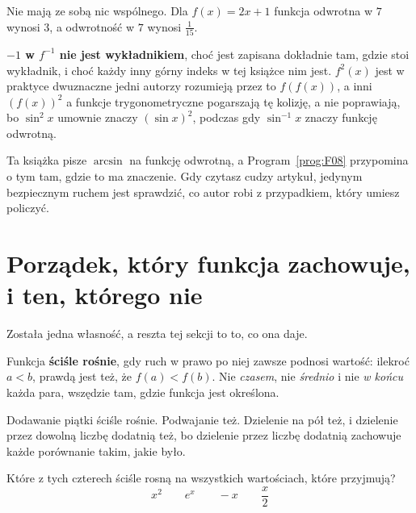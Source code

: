 \begin{fr}
Nie mają ze sobą nic wspólnego. Dla $f(x) = 2x + 1$ funkcja odwrotna w $7$
wynosi $3$, a odwrotność w $7$ wynosi $\frac{1}{15}$.

\begin{trapbox}
\textbf{$-1$ w $f^{-1}$ nie jest wykładnikiem}, choć jest zapisana
dokładnie tam, gdzie stoi wykładnik, i choć każdy inny górny indeks w tej
książce nim jest. $f^{2}(x)$ jest w praktyce dwuznaczne \dash{} jedni autorzy
rozumieją przez to $f(f(x))$, a inni $(f(x))^{2}$ \dash{} a funkcje
trygonometryczne pogarszają tę kolizję, a nie poprawiają, bo $\sin^{2}x$
umownie znaczy $(\sin x)^{2}$, podczas gdy $\sin^{-1}x$ znaczy funkcję
odwrotną.

Ta książka pisze $\arcsin$ na funkcję odwrotną, a Program~\ref{prog:F08}
przypomina o tym tam, gdzie to ma znaczenie. Gdy czytasz cudzy artykuł,
jedynym bezpiecznym ruchem jest sprawdzić, co autor robi z przypadkiem, który
umiesz policzyć.
\end{trapbox}
\end{fr}

\section{Porządek, który funkcja zachowuje, i ten, którego nie}
\label{sec:F05-monotone}

\begin{fr}
Została jedna własność, a reszta tej sekcji to to, co ona daje.

Funkcja \textbf{ściśle rośnie}, gdy ruch w prawo po niej zawsze podnosi
wartość: ilekroć $a < b$, prawdą jest też, że $f(a) < f(b)$. Nie
\emph{czasem}, nie \emph{średnio} i nie \emph{w końcu} \dash{} każda para,
wszędzie tam, gdzie funkcja jest określona.

Dodawanie piątki ściśle rośnie. Podwajanie też. Dzielenie na pół też, i
dzielenie przez dowolną liczbę dodatnią też, bo dzielenie przez liczbę dodatnią
zachowuje każde porównanie takim, jakie było.

Które z tych czterech ściśle rosną na wszystkich wartościach, które
przyjmują?
\[ x^{2} \qquad e^{x} \qquad -x \qquad \frac{x}{2} \]
\dotline
\nextframe
\end{fr}

